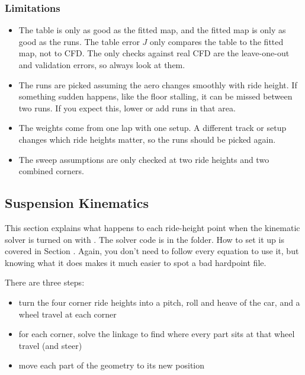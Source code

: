 \subsubsection{Limitations}
\begin{itemize}
    \item The table is only as good as the fitted map, and the fitted map is only as good as the runs. The table error $J$ only compares the table to the fitted map, not to CFD. The only checks against real CFD are the leave-one-out and validation errors, so always look at them.

    \item The runs are picked assuming the aero changes smoothly with ride height. If something sudden happens, like the floor stalling, it can be missed between two runs. If you expect this, lower  or add runs in that area.

    \item The weights come from one lap with one setup. A different track or setup changes which ride heights matter, so the runs should be picked again.

    \item The sweep assumptions are only checked at two ride heights and two combined corners.
\end{itemize}

\subsection{Suspension Kinematics}
\label{sec:suspTheory}

This section explains what happens to each ride-height point when the kinematic solver is turned on with . The solver code is in the  folder. How to set it up is covered in Section . Again, you don't need to follow every equation to use it, but knowing what it does makes it much easier to spot a bad hardpoint file.

There are three steps:
\begin{itemize}
    \item turn the four corner ride heights into a pitch, roll and heave of the car, and a wheel travel at each corner
    \item for each corner, solve the linkage to find where every part sits at that wheel travel (and steer)
    \item move each part of the geometry to its new position
\end{itemize}

